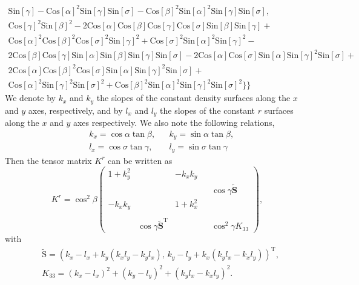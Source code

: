 \documentclass[12pt]{report}
\def\tilde{\widetilde}
\def\bs{\boldsymbol}
\def\Sb{\bs{\mathrm{S}}}
\begin{document}
\begin{multline}
      \text{Sin}[\gamma ]-\text{Cos}[\alpha ]^2 \text{Sin}[\gamma ]
      \text{Sin}[\sigma ]-\text{Cos}[\beta ]^2 \text{Sin}[\alpha ]^2
      \text{Sin}[\gamma ] \text{Sin}[\sigma ],\\
      \text{Cos}[\gamma ]^2
      \text{Sin}[\beta ]^2-2 \text{Cos}[\alpha ] \text{Cos}[\beta ]
      \text{Cos}[\gamma ] \text{Cos}[\sigma ] \text{Sin}[\beta ]
      \text{Sin}[\gamma ]+\\
      \text{Cos}[\alpha ]^2 \text{Cos}[\beta ]^2
      \text{Cos}[\sigma ]^2 \text{Sin}[\gamma ]^2+\text{Cos}[\sigma
      ]^2 \text{Sin}[\alpha ]^2 \text{Sin}[\gamma ]^2-\\
      2\text{Cos}[\beta ] \text{Cos}[\gamma ] \text{Sin}[\alpha ]
      \text{Sin}[\beta ] \text{Sin}[\gamma ] \text{Sin}[\sigma ]-2
      \text{Cos}[\alpha ] \text{Cos}[\sigma ] \text{Sin}[\alpha ]
      \text{Sin}[\gamma ]^2 \text{Sin}[\sigma ]+\\
      2 \text{Cos}[\alpha ]
      \text{Cos}[\beta ]^2 \text{Cos}[\sigma ] \text{Sin}[\alpha ]
      \text{Sin}[\gamma ]^2 \text{Sin}[\sigma ]+\\
      \text{Cos}[\alpha ]^2
      \text{Sin}[\gamma ]^2 \text{Sin}[\sigma ]^2+\text{Cos}[\beta ]^2
      \text{Sin}[\alpha ]^2 \text{Sin}[\gamma ]^2 \text{Sin}[\sigma
      ]^2\}\} 
\end{multline}
We denote by $k_x$ and $k_y$ the slopes of the constant density
surfaces along the $x$ and $y$ axes, respectively, and by $l_x$ and
$l_y$ the slopes of the constant $r$ surfaces along the $x$ and $y$
axes respectively. We also note the following relations,
\begin{align}\
  &k_x = \cos\alpha\tan\beta, & &k_y =
  \sin\alpha\tan\beta,  \label{eq:42}\\
  &l_x = \cos\sigma\tan\gamma, & &l_y =
  \sin\sigma\tan\gamma  \label{eq:43}
 \end{align}
Then the tensor matrix $K^r$ can be written as 
\begin{equation}
  \label{eq:44}
  K^r = \cos^2\beta\left(
    \begin{matrix}
      1 + k_y^2 & { }  &  -k_xk_y & { } & { }\\
          { }   &     { }   & { } & { } & \cos\gamma{\tilde{\mathbf{S}}}\\
      -k_xk_y & { } & 1 + k_x^2 & { } & { }\\
         { } & { } & { } & { } & { } \\
         { } & \cos\gamma\tilde{\mathbf{S}}^\textrm{T} & { } & { } &
         \cos^2\gamma K_{33}
    \end{matrix}\right),
\end{equation}
with 
\begin{align*}
&  \tilde{\Sb} = \left(k_x- l_x + k_y(k_xl_y - k_yl_x),\, k_y-l_y
    + k_x(k_yl_x - k_xl_y)\right)^\textrm{T},\\
&K_{33} = (k_x - l_x)^2 + (k_y - l_y)^2 + (k_yl_x - k_xl_y)^2.
\end{align*}
\end{document}
